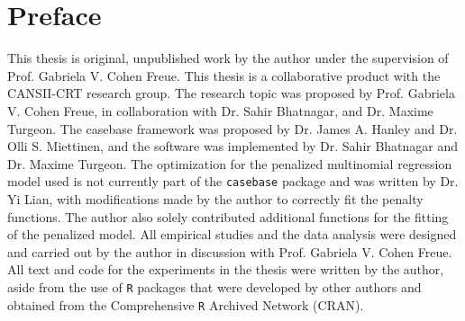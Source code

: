 
\chapter{Preface}

This thesis is original, unpublished work by the author under the supervision of Prof. Gabriela V. Cohen Freue. This thesis is a collaborative product with the CANSII-CRT research group. The research topic was proposed by Prof. Gabriela V. Cohen Freue, in collaboration with Dr. Sahir Bhatnagar, and Dr. Maxime Turgeon. The casebase framework was proposed by Dr. James A. Hanley and Dr. Olli S. Miettinen, and the software was implemented by Dr. Sahir Bhatnagar and Dr. Maxime Turgeon. The optimization for the penalized multinomial regression model used is not currently part of the \texttt{casebase} package and was written by Dr. Yi Lian, with modifications made by the author to correctly fit the penalty functions. The author also solely contributed additional functions for the fitting of the penalized model. All empirical studies and the data analysis were designed and carried out by the author in discussion with Prof. Gabriela V. Cohen Freue. All text and code for the experiments in the thesis were written by the author, aside from the use of \texttt{R} packages that were developed by other authors and obtained from the Comprehensive \texttt{R} Archived Network (CRAN).